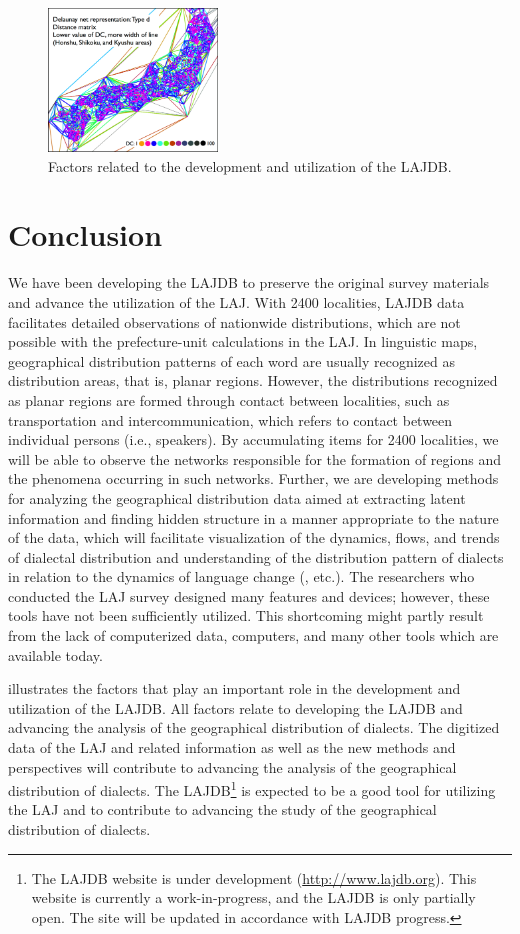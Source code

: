 \documentclass[output=paper]{LSP/langsci}
\begin{document}
\begin{figure}
\includegraphics[width=0.4\textwidth]{illustrations/kuma_fig23}
\caption{Factors related to the development and utilization of the LAJDB.}
\label{fig:26}
\end{figure}  

\section{ Conclusion}
We have been developing the LAJDB to preserve the original survey materials and advance the utilization of the LAJ. With 2400 localities, LAJDB data facilitates detailed observations of nationwide distributions, which are not possible with the prefecture-unit calculations in the LAJ. In linguistic maps, geographical distribution patterns of each word are usually recognized as distribution areas, that is, planar regions. However, the distributions recognized as planar regions are formed through contact between localities, such as transportation and intercommunication, which refers to contact between individual persons (i.e., speakers). By accumulating items for 2400 localities, we will be able to observe the networks responsible for the formation of regions and the phenomena occurring in such networks. Further, we are developing methods for analyzing the geographical distribution data aimed at extracting latent information and finding hidden structure in a manner appropriate to the nature of the data, which will facilitate visualization of the dynamics, flows, and trends of dialectal distribution and understanding of the distribution pattern of dialects in relation to the dynamics of language change (\citealt{sibata_s&k_1993,kumagai_nihon_2013,kumagai_development_2013}, etc.). The researchers who conducted the LAJ survey designed many features and devices; however, these tools have not been sufficiently utilized. This shortcoming might partly result from the lack of computerized data, computers, and many other tools which are available today. 

 illustrates the factors that play an important role in the development and utilization of the LAJDB. All factors relate to developing the LAJDB and advancing the analysis of the geographical distribution of dialects. The digitized data of the LAJ and related information as well as the new methods and perspectives will contribute to advancing the analysis of the geographical distribution of dialects. The LAJDB\footnote{The LAJDB website is under development (\url{http://www.lajdb.org}). This website is currently a work-in-progress, and the LAJDB is only partially open. The site will be updated in accordance with LAJDB progress.} is expected to be a good tool for utilizing the LAJ and to contribute to advancing the study of the geographical distribution of dialects. 
\end{document}
